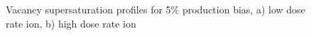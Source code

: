 \documentclass[a4paper]{article}
\begin{document}
      \begin{figure}[h!]  %
        \centering
        \qquad
        \caption{Vacancy supersaturation profiles for 5\% production bias, a) low dose rate ion, b) high dose rate ion}
        \label{figure:vacancy_supersaturation_ion_5}
      \end{figure}
\end{document}
